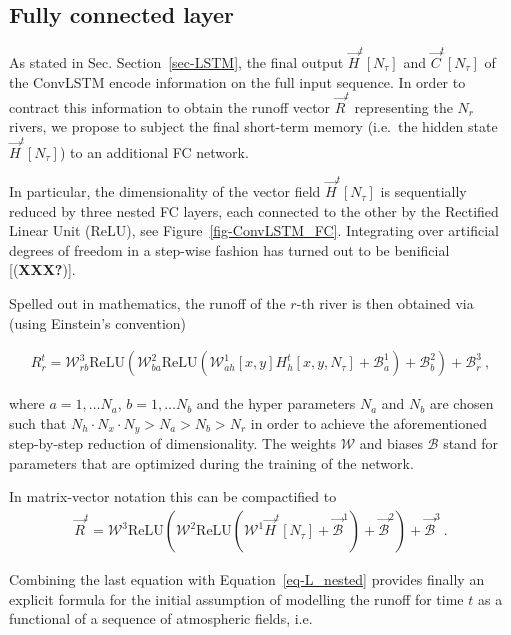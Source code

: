 \documentclass[
]{agujournal2019}
\begin{document}
\hypertarget{sec-FC_layer}{%
\subsection{Fully connected layer}\label{sec-FC_layer}}

As stated in Sec. Section~\ref{sec-LSTM}, the final output
\(\vec{H}^t[N_\tau]\) and \(\vec{C}^t[N_\tau]\) of the ConvLSTM encode
information on the full input sequence. In order to contract this
information to obtain the runoff vector \(\vec{R}^t\) representing the
\(N_r\) rivers, we propose to subject the final short-term memory
(i.e.~the hidden state \(\vec{H}^t[N_\tau]\)) to an additional FC
network.

In particular, the dimensionality of the vector field
\(\vec{H}^t[N_\tau]\) is sequentially reduced by three nested FC layers,
each connected to the other by the Rectified Linear Unit (ReLU), see
Figure~\ref{fig-ConvLSTM_FC}. Integrating over artificial degrees of
freedom in a step-wise fashion has turned out to be benificial
{[}(\textbf{XXX?}){]}.

Spelled out in mathematics, the runoff of the \(r\)-th river is then
obtained via (using Einstein's convention)

\[
\begin{aligned}
R_r^t = \mathcal{W}^{3}_{rb}\mathrm{ReLU}\left(\mathcal{W}^{2}_{ba}\mathrm{ReLU}\left(\mathcal{W}^{1}_{ah} [x,y] H^t_h[x,y, N_\tau] + \mathcal{B}^1_a\right) + \mathcal{B}^2_b \right) + \mathcal{B}^3_r \ ,
\end{aligned}
\]

where \(a=1,\ldots N_a\), \(b=1,\ldots N_b\) and the hyper parameters
\(N_a\) and \(N_b\) are chosen such that
\(N_h\cdot N_x\cdot N_y > N_a > N_b > N_r\) in order to achieve the
aforementioned step-by-step reduction of dimensionality. The weights
\(\mathcal{W}\) and biases \(\mathcal{B}\) stand for parameters that are
optimized during the training of the network.

In matrix-vector notation this can be compactified to \[
\begin{aligned}
\vec{R}^t = \pmb{\mathcal{W}}^{3}\mathrm{ReLU}\left(\pmb{\mathcal{W}}^{2}\mathrm{ReLU}\left(\pmb{\mathcal{W}}^{1} \vec{H}^t[N_\tau] + \vec{\mathcal{B}}^1\right) + \vec{\mathcal{B}}^2 \right) + \vec{\mathcal{B}}^3 \ .
\end{aligned}
\]

Combining the last equation with Equation~\ref{eq-L_nested} provides
finally an explicit formula for the initial assumption of modelling the
runoff for time \(t\) as a functional of a sequence of atmospheric
fields, i.e.
\end{document}
